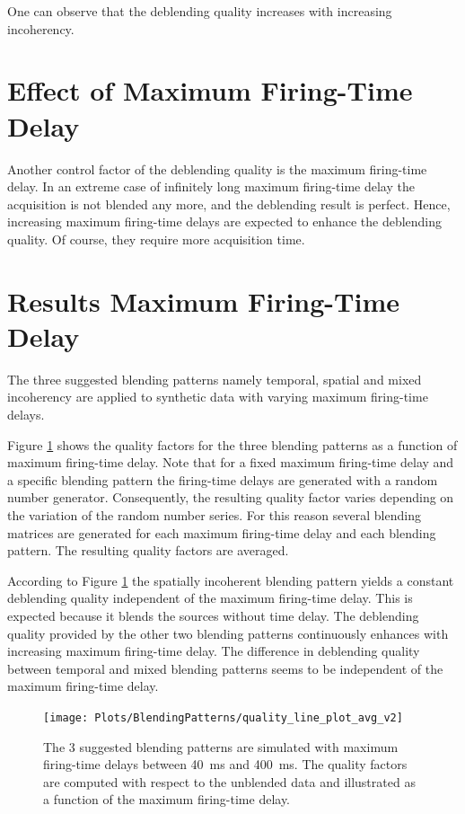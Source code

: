 One can observe that the deblending quality increases with increasing incoherency.


\section{Effect of Maximum Firing-Time Delay}

Another control factor of the deblending quality is the maximum firing-time delay. In an extreme case of infinitely long maximum firing-time delay the acquisition is not blended any more, and the deblending result is perfect. Hence, increasing maximum firing-time delays are expected to enhance the deblending quality. Of course, they require more acquisition time.



\section{Results Maximum Firing-Time Delay}

The three suggested blending patterns namely temporal, spatial and mixed incoherency are applied to synthetic data with varying maximum firing-time delays. 

Figure \ref{fig:Ch-Results-QualityFactors} shows the quality factors for the three blending patterns as a function of maximum firing-time delay. Note that for a fixed maximum firing-time delay and a specific blending pattern the firing-time delays are generated with a random number generator. Consequently, the resulting quality factor varies depending on the variation of the random number series. For this reason several blending matrices are generated for each maximum firing-time delay and each blending pattern. The resulting quality factors are averaged.

According to Figure \ref{fig:Ch-Results-QualityFactors} the spatially incoherent blending pattern yields a constant deblending quality independent of the maximum firing-time delay. This is expected because it blends the sources without time delay. The deblending quality provided by the other two blending patterns continuously enhances with increasing maximum firing-time delay. The difference in deblending quality between temporal and mixed blending patterns seems to be independent of the maximum firing-time delay.

\begin{figure}
	\centering
	\texttt{[image: Plots/BlendingPatterns/quality\_line\_plot\_avg\_v2]}
	\caption{The 3 suggested blending patterns are simulated with maximum firing-time delays between \SI{40}{\milli\second} and \SI{400}{\milli\second}. The quality factors are computed with respect to the unblended data and illustrated as a function of the maximum firing-time delay.}
	\label{fig:Ch-Results-QualityFactors}
\end{figure}

